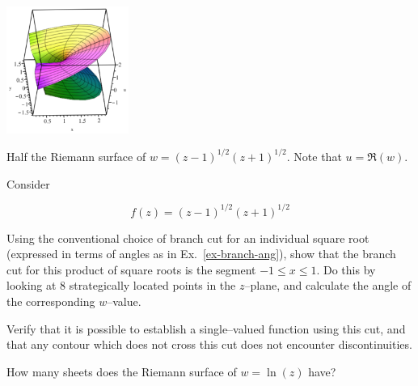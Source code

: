 \begin{exer}
\label{ex-product-roots}
\begin{marginfigure}[0.5cm]
\centering
\includegraphics[width=4cm]{complex/figures/riemann2}
\caption{Half the Riemann surface of $w=(z-1)^{1/2}(z+1)^{1/2}$. Note that $u=\Re(w)$. }
\label{fig-riemann2}
\end{marginfigure}
Consider

$$f(z)=(z-1)^{1/2}(z+1)^{1/2}$$

Using the conventional choice of branch cut for an individual square root (expressed in terms of angles as in Ex.~\ref{ex-branch-ang}), show that the branch cut for this product of square roots is the segment $-1 \le x \le 1$. Do this by looking at 8 strategically located points in the $z$--plane, and calculate the angle of the corresponding $w$--value.


Verify that it is possible to establish a single--valued function using this cut, and that any contour which does not cross this cut does not encounter discontinuities.
\end{exer}

\pagebreak

\begin{exer}
How many sheets does the Riemann surface of $w=\ln(z)$ have?
\end{exer}


